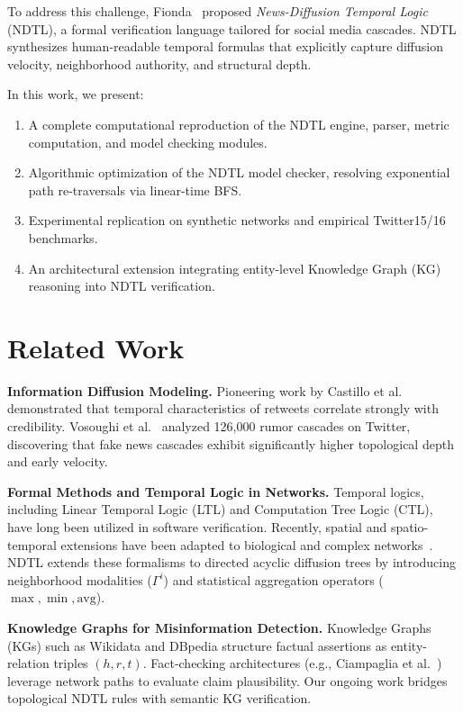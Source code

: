 \documentclass[10pt,twocolumn]{article}
\begin{document}
To address this challenge, Fionda~\cite{fionda2025logic} proposed \textit{News-Diffusion Temporal Logic} (NDTL), a formal verification language tailored for social media cascades. NDTL synthesizes human-readable temporal formulas that explicitly capture diffusion velocity, neighborhood authority, and structural depth. 

In this work, we present:
\begin{enumerate}
    \item A complete computational reproduction of the NDTL engine, parser, metric computation, and model checking modules.
    \item Algorithmic optimization of the NDTL model checker, resolving exponential path re-traversals via linear-time BFS.
    \item Experimental replication on synthetic networks and empirical Twitter15/16 benchmarks.
    \item An architectural extension integrating entity-level Knowledge Graph (KG) reasoning into NDTL verification.
\end{enumerate}

\section{Related Work}

\textbf{Information Diffusion Modeling.} 
Pioneering work by Castillo et al.~\cite{castillo2011information} demonstrated that temporal characteristics of retweets correlate strongly with credibility. Vosoughi et al.~\cite{vosoughi2018spread} analyzed 126,000 rumor cascades on Twitter, discovering that fake news cascades exhibit significantly higher topological depth and early velocity.

\textbf{Formal Methods and Temporal Logic in Networks.} 
Temporal logics, including Linear Temporal Logic (LTL) and Computation Tree Logic (CTL), have long been utilized in software verification. Recently, spatial and spatio-temporal extensions have been adapted to biological and complex networks~\cite{fionda2025logic}. NDTL extends these formalisms to directed acyclic diffusion trees by introducing neighborhood modalities ($\Gamma^i$) and statistical aggregation operators ($\max, \min, \text{avg}$).

\textbf{Knowledge Graphs for Misinformation Detection.} 
Knowledge Graphs (KGs) such as Wikidata and DBpedia structure factual assertions as entity-relation triples $(h, r, t)$. Fact-checking architectures (e.g., Ciampaglia et al.~\cite{ciampaglia2015computational}) leverage network paths to evaluate claim plausibility. Our ongoing work bridges topological NDTL rules with semantic KG verification.
\end{document}
